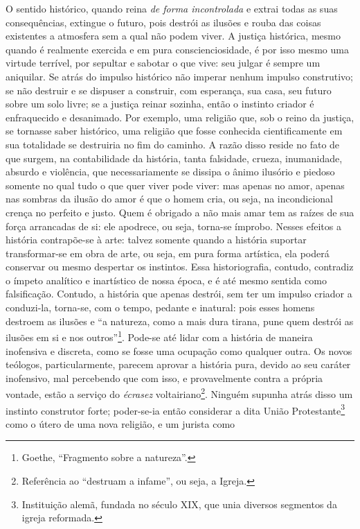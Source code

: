 O sentido histórico, quando reina \emph{de forma incontrolada} e extrai
todas as suas consequências, extingue o futuro, pois destrói as ilusões
e rouba das coisas existentes a atmosfera sem a qual não podem viver. A
justiça histórica, mesmo quando é realmente exercida e em pura
conscienciosidade, é por isso mesmo uma virtude terrível, por sepultar e
sabotar o que vive: seu julgar é sempre um aniquilar. Se atrás do
impulso histórico não imperar nenhum impulso construtivo; se não
destruir e se dispuser a construir, com esperança, sua casa, seu futuro
sobre um solo livre; se a justiça reinar sozinha, então o instinto
criador é enfraquecido e desanimado. Por exemplo, uma religião que, sob
o reino da justiça, se tornasse saber histórico, uma religião que fosse
conhecida cientificamente em sua totalidade se destruiria no fim do
caminho. A razão disso reside no fato de que surgem, na contabilidade da
história, tanta falsidade, crueza, inumanidade, absurdo e violência, que
necessariamente se dissipa o ânimo ilusório e piedoso somente no qual
tudo o que quer viver pode viver: mas apenas no amor, apenas nas sombras
da ilusão do amor é que o homem cria, ou seja, na incondicional crença
no perfeito e justo. Quem é obrigado a não mais amar tem as raízes de
sua força arrancadas de si: ele apodrece, ou seja, torna-se ímprobo.
Nesses efeitos a história contrapõe-se à arte: talvez somente quando a
história suportar transformar-se em obra de arte, ou seja, em pura forma
artística, ela poderá conservar ou mesmo despertar os instintos. Essa
historiografia, contudo, contradiz o ímpeto analítico e inartístico de
nossa época, e é até mesmo sentida como falsificação. Contudo, a
história que apenas destrói, sem ter um impulso criador a conduzi-la,
torna-se, com o tempo, pedante e inatural: pois esses homens destroem as
ilusões e ``a natureza, como a mais dura tirana, pune quem destrói as
ilusões em si e nos outros''\footnote{Goethe, ``Fragmento sobre a
  natureza''.}. Pode-se até lidar com a história de maneira inofensiva
e discreta, como se fosse uma ocupação como qualquer outra. Os novos
teólogos, particularmente, parecem aprovar a história pura, devido ao
seu caráter inofensivo, mal percebendo que com isso, e provavelmente
contra a própria vontade, estão a serviço do \emph{écrasez}
voltairiano\footnote{Referência ao ``destruam a infame'', ou seja, a
  Igreja.}. Ninguém supunha atrás disso um instinto construtor forte;
poder-se-ia então considerar a dita União Protestante\footnote{Instituição
  alemã, fundada no século XIX, que unia diversos segmentos da igreja
  reformada.} como o útero de uma nova religião, e um jurista como
